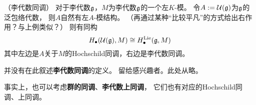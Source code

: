 \begin{example}（李代数同调）%
对于李代数$\mathfrak{g}$，$M$为李代数$\mathfrak{g}$的一个左$K$-模。
令$A:=\mathcal{U}(\mathfrak{g})$为$\mathfrak{g}$的泛包络代数，
则$A$自然有左$A$-模结构。
（再通过某种“比较平凡”的方式给出右作用？与上例类似？）
则有同构
$$H_{\bullet}(\mathcal{U}(\mathfrak{g}),M)
\cong H^{\operatorname{Lie}}_{\bullet}(\mathfrak{g},M)$$
其中左边是$A$关于$M$的Hochschild同调，右边是李代数同调。
\end{example}

并没有在此叙述\textbf{李代数同调}的定义。
留给感兴趣者。此处从略。

事实上，也可以考虑\textbf{群的同调}、\textbf{李代数上同调}，
它们也有对应的Hochschild同调、上同调。








